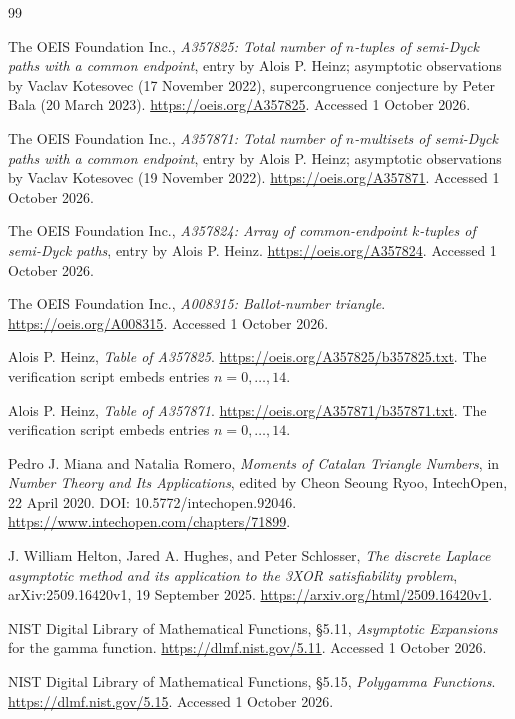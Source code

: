 \documentclass[11pt,a4paper]{article}
\numberwithin{equation}{section}
\theoremstyle{definition}
\begin{document}
\begin{thebibliography}{99}
\small
\setlength{\parskip}{0pt}
\setlength{\itemsep}{3pt}

The OEIS Foundation Inc., \emph{A357825: Total number of $n$-tuples of
semi-Dyck paths with a common endpoint}, entry by Alois P. Heinz;
asymptotic observations by Vaclav Kotesovec (17 November 2022),
supercongruence conjecture by Peter Bala (20 March 2023).
\url{https://oeis.org/A357825}. Accessed 1 October 2026.

The OEIS Foundation Inc., \emph{A357871: Total number of $n$-multisets
of semi-Dyck paths with a common endpoint}, entry by Alois P. Heinz;
asymptotic observations by Vaclav Kotesovec (19 November 2022).
\url{https://oeis.org/A357871}. Accessed 1 October 2026.

The OEIS Foundation Inc., \emph{A357824: Array of common-endpoint
$k$-tuples of semi-Dyck paths}, entry by Alois P. Heinz.
\url{https://oeis.org/A357824}. Accessed 1 October 2026.

The OEIS Foundation Inc., \emph{A008315: Ballot-number triangle}.
\url{https://oeis.org/A008315}. Accessed 1 October 2026.

Alois P. Heinz, \emph{Table of A357825}.
\url{https://oeis.org/A357825/b357825.txt}.
The verification script embeds entries $n=0,\ldots,14$.

Alois P. Heinz, \emph{Table of A357871}.
\url{https://oeis.org/A357871/b357871.txt}.
The verification script embeds entries $n=0,\ldots,14$.

Pedro J. Miana and Natalia Romero, \emph{Moments of Catalan Triangle
Numbers}, in \emph{Number Theory and Its Applications}, edited by
Cheon Seoung Ryoo, IntechOpen, 22 April 2020.
DOI: 10.5772/intechopen.92046.
\url{https://www.intechopen.com/chapters/71899}.

J. William Helton, Jared A. Hughes, and Peter Schlosser,
\emph{The discrete Laplace asymptotic method and its application to the
3XOR satisfiability problem}, arXiv:2509.16420v1, 19 September 2025.
\url{https://arxiv.org/html/2509.16420v1}.

NIST Digital Library of Mathematical Functions,
\S5.11, \emph{Asymptotic Expansions} for the gamma function.
\url{https://dlmf.nist.gov/5.11}. Accessed 1 October 2026.

NIST Digital Library of Mathematical Functions,
\S5.15, \emph{Polygamma Functions}.
\url{https://dlmf.nist.gov/5.15}. Accessed 1 October 2026.


\end{thebibliography}
\end{document}
